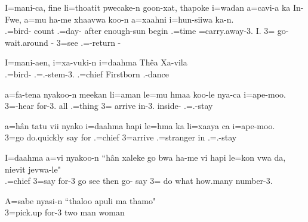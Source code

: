 \ea
\gll I=mani-ca, fine li=thoatit pwecake-n goon-xat, thapoke i=wadan a=cavi-a ka In-Fwe, a=mu ha-me xhaavwa koo-n a=xaahni i=hun-siiwa ka-n.\\ .=bird- count .=day- after enough-sun begin .=time =carry.away-3.  I. 3= go- wait.around - 3=see  .=-return -\\ \glt {}
\z

\ea
\gll I=mani-aen, i=xa-vuki-n i=daahma Thêa Xa-vila\\ 
    .=bird- .=.-stem-3. .=chief Firstborn .-dance\\ 
    \glt {}
\z

\ea
\gll  a=fa-tena nyakoo-n meekan li=aman le=mu hmaa koo-le nya-ca i=ape-moo.\\ 3=-hear for-3. all .=thing 3= arrive in-3. inside- .=.-stay\\ \glt {}
\z

\ea
\gll a=hân tatu vii nyako i=daahma hapi le=hma ka li=xaaya ca i=ape-moo.\\ 3=go do.quickly say for .=chief  3=arrive  .=stranger in .=.-stay\\ \glt {}
\z

\ea
\gll I=daahma a=vi nyakoo-n ``hân xaleke go bwa ha-me vi hapi le=kon vwa da, nievit jevwa-le"\\ .=chief 3=say for-3 go see then  go- say  3= do what how.many number-3.\\ \glt {}
\z 

\ea
\gll A=sabe nyasi-n ``thaloo apuli ma thamo"\\ 3=pick.up for-3 two man  woman\\ \glt {}
\z

